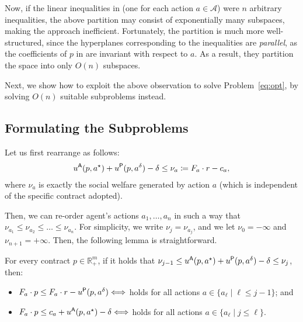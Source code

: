 Now, if the linear inequalities in  (one for each action $a \in \mathcal{A}$) were $n$ arbitrary inequalities, the above partition may consist of exponentially many subspaces, making the approach inefficient. 
Fortunately, the partition is much more well-structured, since the hyperplanes corresponding to the inequalities are {\em parallel}, as the coefficients of $p$ in  are invariant with respect to $a$.
As a result, they partition the space into only $O(n)$ subspaces.


Next, we show how to exploit the above observation to solve Problem~\eqref{eq:opt}, by solving $O(n)$ suitable subproblems instead.

\subsection{Formulating the Subproblems}

Let us first rearrange  as follows:
\begin{align}
	\label{eq:right-sides-re}
	u^{\mathsf{A}}(p, a^\star) + u^{\mathsf{P}}(p, a^\delta) - \delta \le \nu_a \coloneqq F_a \cdot r - c_a, 
\end{align} 
where $\nu_a$ is exactly the social welfare generated by action $a $ (which is independent of the specific contract adopted).

Then, we can re-order agent's actions $a_1, \dots, a_n$ in such a way that $\nu_{a_1} \le \nu_{a_2} \le \dots \le \nu_{a_n}$. For simplicity, we write $\nu_j = \nu_{a_j}$, and we let $\nu_0 = -\infty$ and $\nu_{n+1} = +\infty$.
Then, the following lemma is straightforward.

\begin{lemma}
	\label{lmm:right-sides}
	For every contract $p \in \mathbb{R}^{m}_{+}$, if it holds that $\nu_{j-1} \leq u^{\mathsf{A}}(p, a^\star) + u^{\mathsf{P}}(p, a^\delta) - \delta \leq \nu_{j}$, then:
	\begin{itemize}
		\item $F_a \cdot p \le F_a \cdot r - u^{\mathsf{P}}(p, a^\delta) \Longleftrightarrow$  holds for all actions $a  \in \{a_\ell \mid \ell \le j - 1\}$; and 
		\item $F_a \cdot p \le c_a + u^{\mathsf{A}}(p, a^\star) - \delta \Longleftrightarrow$  holds for all actions $a  \in \{a_\ell \mid j \le \ell \}$.
	\end{itemize}
\end{lemma}

